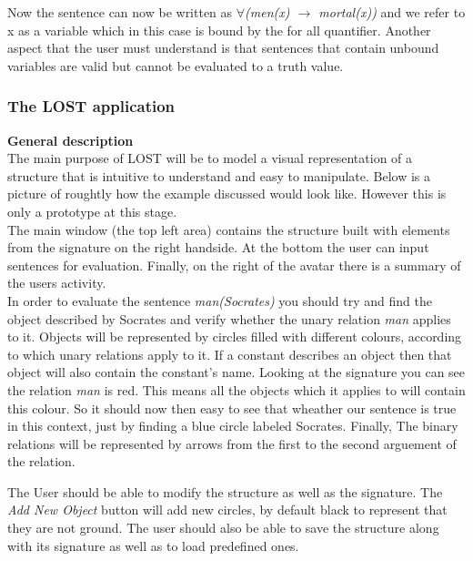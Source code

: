 \documentclass{article}
\begin{document}
\noindent Now the sentence can now be written as \emph{$\forall$(men(x) $\rightarrow$ mortal(x))} and we refer to x as a variable which in this case is bound by the for all quantifier. Another aspect that the user must understand is that sentences that contain unbound variables are valid but cannot be evaluated to a truth value.

	\subsubsection{The LOST application}
\textbf{General description}\\

\noindent The main purpose of LOST will be to model a visual representation of a structure that is intuitive to understand and easy to manipulate. Below is a picture of roughtly how the example discussed would look like. However this is only a prototype at this stage.\\


\noindent The main window (the top left area) contains the structure built with elements from the signature on the right handside. At the bottom the user can input sentences for evaluation. Finally, on the right of the avatar there is a summary of the users activity.\\

\noindent In order to evaluate the sentence \emph{man(Socrates)} you should try and find the object described by Socrates and verify whether the unary relation \emph{man} applies to it. Objects will be represented by circles filled with different colours, according to which unary relations apply to it. If a constant describes an object then that object will also contain the constant's name. Looking at the signature you can see the relation \emph{man} is red. This means all the objects which it applies to will contain this colour. So it should now then easy to see that wheather our sentence is true in this context, just by finding a blue circle labeled Socrates. Finally, The binary relations will be represented by arrows from the first to the second arguement of the relation.

\noindent The User should be able to modify the structure as well as the signature. The \emph{Add New Object} button will add new circles, by default black to represent that they are not ground. The user should also be able to save the structure along with its signature as well as to load predefined ones. \\
\end{document}
